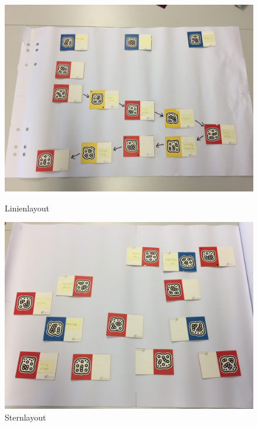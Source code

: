 \begin{figure}[h]
	\centering 
	\begin{minipage}[b]{0.45\textwidth} 
		\includegraphics[width=\textwidth]{figures/linienlegemethode.jpg}
		\caption[Linienlayout]{Linienlayout  \protect~\cite{max}}
		\label{fig:linienlegemethode} 
	\end{minipage}
	\hfill 
	\begin{minipage}[b]{0.45\textwidth} 
		\includegraphics[width=\textwidth]{figures/sternlegemethode.jpg}
		\caption[Sternlayout]{Sternlayout \protect~\cite{max}}
		\label{fig:sternlegemethode} 
	\end{minipage}
\end{figure}

